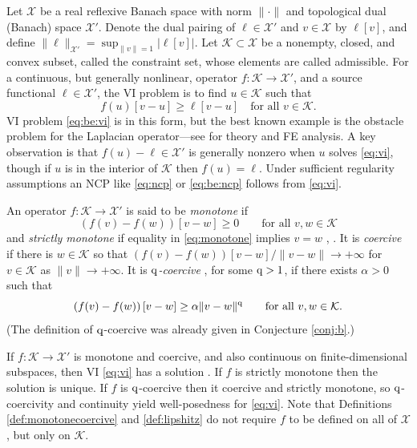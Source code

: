 \documentclass[hidelinks,onefignum,onetabnum,final]{siamart220329}  %
\newcommand{\cK}{\mathcal{K}}
\newcommand{\cX}{\mathcal{X}}
\newcommand{\qq}{{\text{\textnormal{q}}}}
\begin{document}
Let $\cX$ be a real reflexive Banach space with norm $\|\cdot\|$ and topological dual (Banach) space $\cX'$.  Denote the dual pairing of $\ell \in \cX'$ and $v\in\cX$ by $\ell[v]$, and define $\|\ell\|_{\cX'} = \sup_{\|v\|=1} \big|\ell[v]\big|$.  Let $\cK \subset \cX$ be a nonempty, closed, and convex subset, called the constraint set, whose elements are called admissible.  For a continuous, but generally nonlinear, operator $f:\cK \to \cX'$, and a source functional $\ell\in \cX'$, the VI problem is to find $u\in \cK$ such that
\begin{equation}
f(u)[v-u] \ge \ell[v-u] \quad \text{for all } v\in \cK. \label{eq:vi}
\end{equation}
VI problem \eqref{eq:be:vi} is in this form, but the best known example is the obstacle problem for the Laplacian operator---see \cite{Ciarlet2002,Evans2010,KinderlehrerStampacchia1980} for theory and FE analysis.  A key observation is that $f(u)-\ell \in \cX'$ is generally nonzero when $u$ solves \eqref{eq:vi}, though if $u$ is in the interior of $\cK$ then $f(u)=\ell$.  Under sufficient regularity assumptions an NCP like \eqref{eq:ncp} or \eqref{eq:be:ncp} follows from \eqref{eq:vi}.

\begin{definition} \label{def:monotonecoercive}
An operator $f:\cK \to \cX'$ is said to be \emph{monotone} if
\begin{equation}
\left(f(v)-f(w)\right)[v-w] \ge 0 \qquad \text{for all } v,w \in \cK \label{eq:monotone}
\end{equation}
and \emph{strictly monotone} if equality in \eqref{eq:monotone} implies $v=w$ \cite{Minty1963}, \cite[Chapter III]{KinderlehrerStampacchia1980}.  It is \emph{coercive} if there is $w\in \cK$ so that $\left(f(v)-f(w)\right)[v-w]/\|v-w\| \to +\infty$ for $v \in \cK$ as $\|v\| \to +\infty$.  It is \emph{$\qq$-coercive} \cite{Bueler2021conservation}, for some $\qq>1$, if there exists $\alpha>0$ such that
\begin{equation}
\left(f(v)-f(w)\right)[v-w] \ge \alpha \|v-w\|^\qq \qquad \text{for all } v,w \in \cK. \label{eq:qcoercive}
\end{equation}
(The definition of $\qq$-coercive was already given in Conjecture \ref{conj:b}.)
\end{definition}

If $f:\cK \to \cX'$ is monotone and coercive, and also continuous on finite-dimensional subspaces, then VI \eqref{eq:vi} has a solution \cite[Corollary III.1.8]{KinderlehrerStampacchia1980}.  If $f$ is strictly monotone then the solution is unique.  If $f$ is $\qq$-coercive then it coercive and strictly monotone, so $\qq$-coercivity and continuity yield well-posedness for \eqref{eq:vi}.  Note that Definitions \ref{def:monotonecoercive} and \ref{def:lipshitz} do not require $f$ to be defined on all of $\cX$, but only on $\cK$.
  
\end{document}
